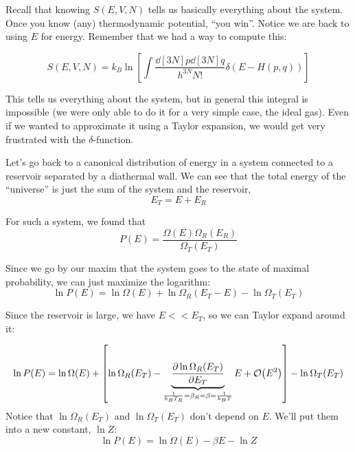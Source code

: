 \documentclass[a4paper,twoside,master.tex]{subfiles}
\begin{document}

Recall that knowing $ S(E,V,N) $ tells us basically everything about the system. Once you know (any) thermodynamic potential, ``you win''. Notice we are back to using $ E $ for energy. Remember that we had a way to compute this:

\begin{equation}
    S(E,V,N) = k_B \ln\left[ \int \frac{\dd[3N]{p} \dd[3N]{q}}{h^{3N} N!} \delta(E-H(p,q)) \right]
\end{equation}

This tells us everything about the system, but in general this integral is impossible (we were only able to do it for a very simple case, the ideal gas). Even if we wanted to approximate it using a Taylor expansion, we would get very frustrated with the $\delta$-function.

Let's go back to a canonical distribution of energy in a system connected to a reservoir separated by a diathermal wall. We can see that the total energy of the ``universe'' is just the sum of the system and the reservoir,
\begin{equation}
    E_T = E + E_R
\end{equation}

For such a system, we found that
\begin{equation}
    P(E) = \frac{\Omega(E) \Omega_R(E_R)}{\Omega_T(E_T)}
\end{equation}

Since we go by our maxim that the system goes to the state of maximal probability, we can just maximize the logarithm:
\begin{equation}
    \ln P(E) = \ln \Omega(E) + \ln \Omega_R(E_T - E) - \ln \Omega_T(E_T)
\end{equation}

Since the reservoir is large, we have $ E << E_T $, so we can Taylor expand around it:

\begin{equation}
    \ln P(E) = \ln \Omega(E) + \left[ \ln \Omega_R(E_T) - \underbrace{\pdv{\ln \Omega_R(E_T)}{E_T}}_{\frac{1}{k_B T_R} = \beta_R = \beta = \frac{1}{k_B T}}E + \order{E^2} \right] - \ln \Omega_T(E_T)
\end{equation}
Notice that $ \ln \Omega_R(E_T) $ and $ \ln \Omega_T(E_T) $ don't depend on $ E $. We'll put them into a new constant, $ \ln Z $:
\begin{equation}
    \ln P(E) = \ln \Omega(E) - \beta E - \ln Z
\end{equation}
\end{document}
